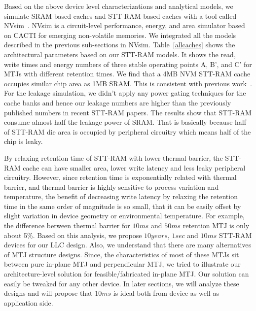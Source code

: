 Based on the above device level characterizations and analytical models, we simulate SRAM-based
caches and STT-RAM-based caches with a tool called NVsim~\cite{CACTI:PCRAMsim}. NVsim is a
circuit-level performance, energy, and area simulator based on CACTI for emerging non-volatile
memories. We integrated all the models described in the previous sub-sections in NVsim.
Table~\ref{allcaches} shows the architectural parameters based on our STT-RAM models. It shows the
read, write times and energy numbers of three stable operating points A, B', and C' for MTJs with different retention times. We find that a 4MB NVM STT-RAM cache occupies similar chip area as 1MB SRAM. This is consistent with previous work~\cite{CACTI:DAC08:Dong}. For the leakage simulation, we didn't apply any power gating techniques for the cache banks and hence our leakage numbers are higher than the previously published numbers in recent STT-RAM papers. The results show that STT-RAM consume almost half the leakage power of SRAM. That is basically because half of STT-RAM die area is occupied by peripheral circuitry which means half of the chip is leaky.

By relaxing retention time of STT-RAM with lower thermal barrier, the STT-RAM cache can have smaller
area, lower write latency and less leaky peripheral circuitry. However, since retention time is
exponentially related with thermal barrier, and thermal barrier is highly sensitive to process
variation and temperature, the benefit of decreasing write latency by relaxing the retention time in
the same order of magnitude is so small, that it can be easily offset by slight variation in device
geometry or environmental temperature. For example, the difference between thermal barrier for $10ms$ and
$50ms$ retention MTJ is only about 5\%.
Based on this analysis, we propose $10years$, $1sec$ and $10ms$ STT-RAM devices for our
LLC design. Also, we understand that there are many alternatives of MTJ structure designs. Since, the
characteristics of most of these MTJs sit between pure in-plane MTJ and perpendicular MTJ, we tried
to illustrate our architecture-level solution for feasible/fabricated in-plane MTJ. Our solution 
can easily be tweaked for any other device. In later sections, we will analyze these designs and will propose that $10ms$ is ideal both from device as well as application side.
